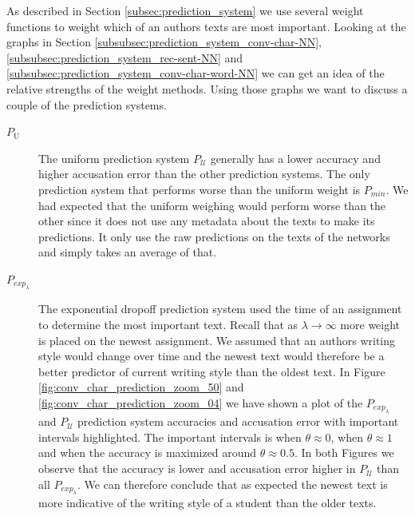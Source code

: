 As described in Section \ref{subsec:prediction_system} we use several weight
functions to weight which of an authors texts are most important. Looking
at the graphs in Section \ref{subsubsec:prediction_system_conv-char-NN},
\ref{subsubsec:prediction_system_rec-sent-NN} and
\ref{subsubsec:prediction_system_conv-char-word-NN} we can get an idea of the
relative strengths of the weight methods. Using those graphs we want to discuss
a couple of the prediction systems.

\begin{description}

    \item[$P_\mathrm{U}$]

        The uniform prediction system $P_\mathcal{U}$ generally has a lower
        accuracy and higher accusation error than the other prediction systems.
        The only prediction system that performs worse than the uniform weight
        is $P_{min}$. We had expected that the uniform weighing would perform
        worse than the other since it does not use any metadata about the texts
        to make its predictions. It only use the raw predictions on the texts of
        the networks and simply takes an average of that.

    \item[$P_{exp_\lambda}$]

        The exponential dropoff prediction system used the time of an
        assignment to determine the most important text. Recall that
        as $\lambda \rightarrow \infty$ more weight is placed on the
        newest assignment. We assumed that an authors writing style
        would change over time and the newest text would therefore be
        a better predictor of current writing style than the oldest
        text. In Figure \ref{fig:conv_char_prediction_zoom_50} and
        \ref{fig:conv_char_prediction_zoom_04} we have shown a plot of the
        $P_{exp_\lambda}$ and $P_\mathcal{U}$ prediction system accuracies and
        accusation error with important intervals highlighted. The important
        intervals is when $\theta \approx 0$, when $\theta \approx 1$ and when
        the accuracy is maximized around $\theta \approx 0.5$. In both Figures
        we observe that the accuracy is lower and accusation error higher in
        $P_\mathcal{U}$ than all $P_{exp_\lambda}$. We can therefore conclude
        that as expected the newest text is more indicative of the writing style
        of a student than the older texts.


\end{description}
